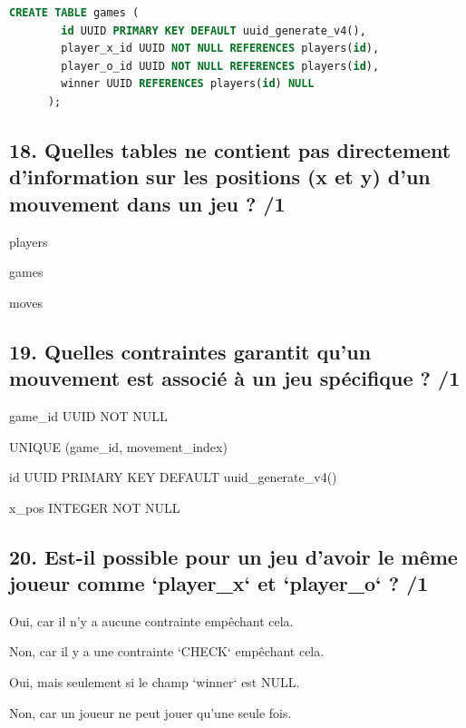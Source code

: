 \documentclass[12pt,a4paper]{article}
\begin{document}
\begin{flushleft}
\begin{choices}
  \item \hspace{1cm} \begin{lstlisting}[language=SQL]
      CREATE TABLE games (
        id UUID PRIMARY KEY DEFAULT uuid_generate_v4(),
        player_x_id UUID NOT NULL REFERENCES players(id),
        player_o_id UUID NOT NULL REFERENCES players(id),
        winner UUID REFERENCES players(id) NULL
      );
  \end{lstlisting}
\end{choices}

\subsection*{18. Quelles tables ne contient pas directement d'information sur les positions (x et y) d'un mouvement dans un jeu ? /1}
\begin{choices}
    \item players
    \item games
    \item moves
\end{choices}

\subsection*{19. Quelles contraintes garantit qu'un mouvement est associé à un jeu spécifique ? /1}
\begin{choices}
    \item game\_id UUID NOT NULL
    \item UNIQUE (game\_id, movement\_index)
    \item id UUID PRIMARY KEY DEFAULT uuid\_generate\_v4()
    \item x\_pos INTEGER NOT NULL
\end{choices}

\subsection*{20. Est-il possible pour un jeu d'avoir le même joueur comme `player\_x` et `player\_o` ? /1}
\begin{choices}
    \item Oui, car il n'y a aucune contrainte empêchant cela.
    \item Non, car il y a une contrainte `CHECK` empêchant cela.
    \item Oui, mais seulement si le champ `winner` est NULL.
    \item Non, car un joueur ne peut jouer qu'une seule fois.
\end{choices}


\end{flushleft}
\end{document}
